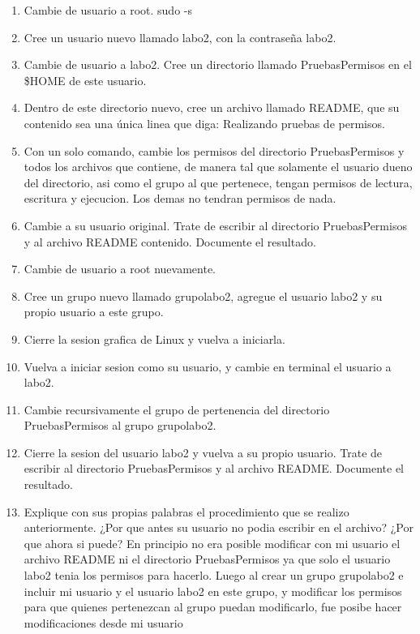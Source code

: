 \documentclass[11pt]{article}
\begin{document}
\begin{enumerate}
    \item Cambie de usuario a root. sudo -s
    \item Cree un usuario nuevo llamado labo2, con la contraseña labo2.
    \item Cambie de usuario a labo2. Cree un directorio llamado PruebasPermisos en el \$HOME de este usuario.
    \item Dentro de este directorio nuevo, cree un archivo llamado README, que su contenido sea una única linea que diga: Realizando pruebas de permisos.
    \item Con un solo comando, cambie los permisos del directorio PruebasPermisos y todos los archivos que contiene, de manera tal que solamente el usuario dueno del directorio, asi como el grupo al que pertenece, tengan permisos de lectura, escritura y ejecucion. Los demas no tendran permisos de nada.
    \item Cambie a su usuario original. Trate de escribir al directorio PruebasPermisos y al archivo README contenido. Documente el resultado.
    \item Cambie de usuario a root nuevamente.
    \item Cree un grupo nuevo llamado grupolabo2, agregue el usuario labo2 y su propio usuario a este grupo.
    \item Cierre la sesion grafica de Linux y vuelva a iniciarla.
    \item Vuelva a iniciar sesion como su usuario, y cambie en terminal el usuario a labo2.
    \item Cambie recursivamente el grupo de pertenencia del directorio PruebasPermisos al grupo grupolabo2.
    \item Cierre la sesion del usuario labo2 y vuelva a su propio usuario. Trate de escribir al directorio PruebasPermisos y al archivo README. Documente el resultado.
    \item Explique con sus propias palabras el procedimiento que se realizo anteriormente. ¿Por que antes su usuario no podia escribir en el archivo? ¿Por que ahora si puede? En principio no era posible modificar con mi usuario el archivo README ni el directorio PruebasPermisos ya que solo el usuario labo2 tenia los permisos para hacerlo. Luego al crear un grupo grupolabo2 e incluir mi usuario y el usuario labo2 en este grupo, y modificar los permisos para que quienes pertenezcan al grupo puedan modificarlo, fue posibe hacer modificaciones desde mi usuario

\end{enumerate}
\end{document}
